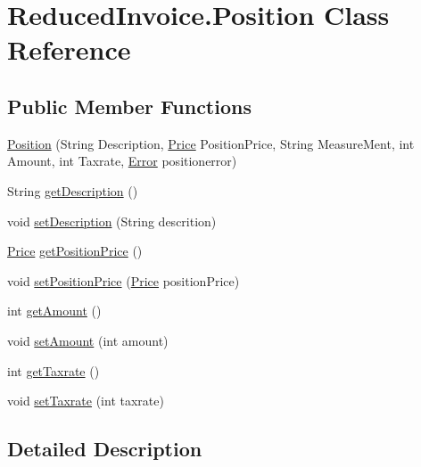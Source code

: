 \hypertarget{class_reduced_invoice_1_1_position}{}\section{Reduced\+Invoice.\+Position Class Reference}
\label{class_reduced_invoice_1_1_position}
\subsection*{Public Member Functions}
\begin{DoxyCompactItemize}
\item 
\hyperlink{class_reduced_invoice_1_1_position_addc0dce10bd22dce5f94226b283bcf4d}{Position} (String Description, \hyperlink{class_reduced_invoice_1_1_price}{Price} Position\+Price, String Measure\+Ment, int Amount, int Taxrate, \hyperlink{enum_reduced_invoice_1_1_a_invoice_1_1_error}{Error} positionerror)
\item 
String \hyperlink{class_reduced_invoice_1_1_position_ab4c6da1a734c40337974e76ea4491dbf}{get\+Description} ()
\item 
void \hyperlink{class_reduced_invoice_1_1_position_a86b0bb99ef806d0e8298e8b5030f8964}{set\+Description} (String descrition)
\item 
\hyperlink{class_reduced_invoice_1_1_price}{Price} \hyperlink{class_reduced_invoice_1_1_position_ace39a33b2c836d4689b4eae38f6c3ca3}{get\+Position\+Price} ()
\item 
void \hyperlink{class_reduced_invoice_1_1_position_aeac9fdead656ad61a41dbca42a4d8fdd}{set\+Position\+Price} (\hyperlink{class_reduced_invoice_1_1_price}{Price} position\+Price)
\item 
int \hyperlink{class_reduced_invoice_1_1_position_a5f2aa6f49886d3186e53e76a55dfdf91}{get\+Amount} ()
\item 
void \hyperlink{class_reduced_invoice_1_1_position_afd4c38ea287c5e39f5537673f4efc1ce}{set\+Amount} (int amount)
\item 
int \hyperlink{class_reduced_invoice_1_1_position_ae6fa813dd7b205c91b5d340e467751da}{get\+Taxrate} ()
\item 
void \hyperlink{class_reduced_invoice_1_1_position_a44eab6fd92814298a7e34ff1ffd13422}{set\+Taxrate} (int taxrate)
\end{DoxyCompactItemize}


\subsection{Detailed Description}


